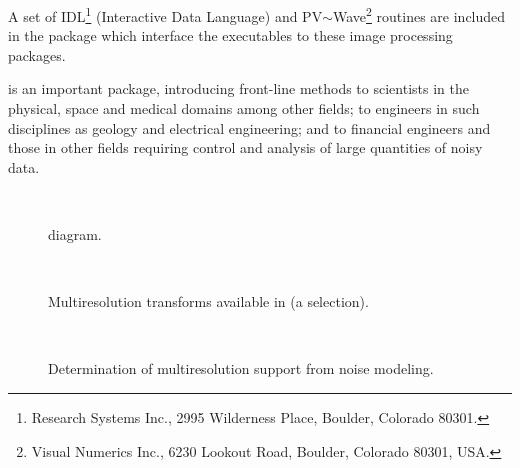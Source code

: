 A set of  IDL\footnote{Research Systems 
Inc., 2995 Wilderness Place, Boulder, Colorado 80301.} (Interactive 
Data Language) 
and PV$\sim$Wave\footnote{Visual Numerics Inc.,  6230 Lookout Road, 
Boulder, Colorado 80301, USA.}
routines
are included in the package which interface the executables to these
image processing packages.  

\proj is an important package, 
introducing front-line methods to scientists 
in the physical, space and medical domains among other fields; to engineers in 
such disciplines as geology and electrical engineering; and to financial 
engineers and those in  other fields requiring control and analysis of 
large quantities of noisy data.  


\begin{figure}[t]
\centerline{
\hbox{
}}
\caption{\proj diagram.}
\label{fig_sadam1}
\end{figure}

\begin{figure}[htb]
\centerline{
\hbox{
}}
\caption{Multiresolution transforms available in \proj (a selection).}
\label{fig_sadam2}
\end{figure}

\begin{figure}[htb]
\centerline{
\hbox{
}
}
\caption{Determination of multiresolution support from noise modeling.}
\label{fig_modelnoise}
\end{figure}
